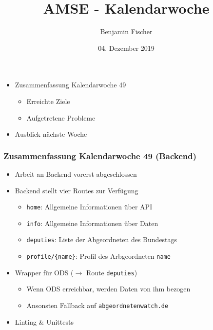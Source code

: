 \documentclass{beamer}
\title{AMSE - Kalendarwoche \cw{}}
\date{04. Dezember 2019}
\author{Benjamin Fischer}
\institute{benjamin.f.fischer@fau.de}
\newcommand{\cw}{49}
\begin{document}
  \maketitle

  \begin{frame}
    \begin{itemize}
      \item Zusammenfassung Kalendarwoche \cw{}
      \begin{itemize}
        \item Erreichte Ziele
        \item Aufgetretene Probleme
      \end{itemize}
      \item Ausblick nächste Woche
    \end{itemize}
  \end{frame}

  \begin{frame}
    \frametitle{Zusammenfassung Kalendarwoche \cw{} (Backend)}
    \begin{itemize}
      \item Arbeit an Backend vorerst abgeschlossen
      \item Backend stellt vier Routes zur Verfügung
      \begin{itemize}
        \item \texttt{home}: Allgemeine Informationen über API
        \item \texttt{info}: Allgemeine Informationen über Daten
        \item \texttt{deputies}: Liste der Abgeordneten des Bundestags
        \item \texttt{profile/\{name\}}: Profil des Arbgeordneten \texttt{name}
      \end{itemize}
      \item Wrapper für ODS ($\rightarrow$ Route \texttt{deputies})
      \begin{itemize}
        \item Wenn ODS erreichbar, werden Daten von ihm bezogen
        \item Ansonsten Fallback auf \texttt{abgeordnetenwatch.de}
      \end{itemize}
      \item Linting \& Unittests
    \end{itemize}
  \end{frame}
\end{document}
